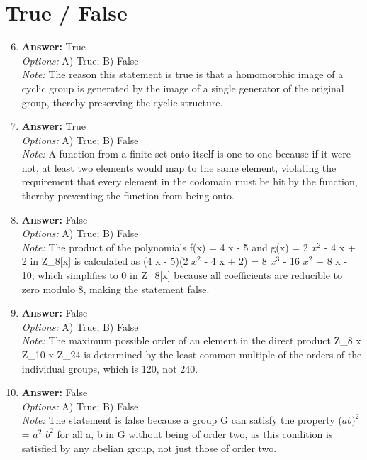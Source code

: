 \documentclass[12pt]{article}
\begin{document}
\section*{True / False}
\begin{enumerate}[label=\arabic*.]
\setcounter{enumi}{5}
\item \textbf{Answer:} True
\\ \textit{Options:} A) True; B) False
\\ \textit{Note:} The reason this statement is true is that a homomorphic image of a cyclic group is generated by the image of a single generator of the original group, thereby preserving the cyclic structure.
\item \textbf{Answer:} True
\\ \textit{Options:} A) True; B) False
\\ \textit{Note:} A function from a finite set onto itself is one-to-one because if it were not, at least two elements would map to the same element, violating the requirement that every element in the codomain must be hit by the function, thereby preventing the function from being onto.
\item \textbf{Answer:} False
\\ \textit{Options:} A) True; B) False
\\ \textit{Note:} The product of the polynomials f(x) = 4 x - 5 and g(x) = 2 $x^2$ - 4 x + 2 in Z\_8[x] is calculated as (4 x - 5)(2 $x^2$ - 4 x + 2) = 8 $x^3$ - 16 $x^2$ + 8 x - 10, which simplifies to 0 in Z\_8[x] because all coefficients are reducible to zero modulo 8, making the statement false.
\item \textbf{Answer:} False
\\ \textit{Options:} A) True; B) False
\\ \textit{Note:} The maximum possible order of an element in the direct product Z\_8 x Z\_10 x Z\_24 is determined by the least common multiple of the orders of the individual groups, which is 120, not 240.
\item \textbf{Answer:} False
\\ \textit{Options:} A) True; B) False
\\ \textit{Note:} The statement is false because a group G can satisfy the property ($ab)^2$ = $a^2$ $b^2$ for all a, b in G without being of order two, as this condition is satisfied by any abelian group, not just those of order two.
\end{enumerate}
\end{document}
